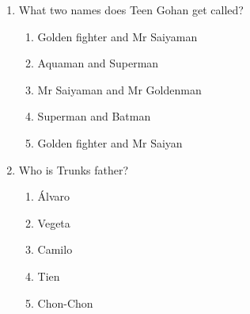 \documentclass[letterpaper,addpoints,answers,twocolumn,10pt]{exam}
\begin{document}
\begin{enumerate}[leftmargin=.2in]
\begin{enumerate}[noitemsep,leftmargin=0in]
\end{enumerate}



\item  What two names does Teen Gohan get called?


\begin{enumerate}[noitemsep,leftmargin=0in]


\item  Golden fighter and Mr Saiyaman
\item  Aquaman and Superman
\item  Mr Saiyaman and Mr Goldenman
\item  Superman and Batman
\item  Golden fighter and Mr Saiyan


\end{enumerate}



\item  Who is Trunks father?


\begin{enumerate}[noitemsep,leftmargin=0in]


\item  Álvaro
\item  Vegeta
\item  Camilo
\item  Tien
\item  Chon-Chon


\end{enumerate}



\end{enumerate}
\end{document}
